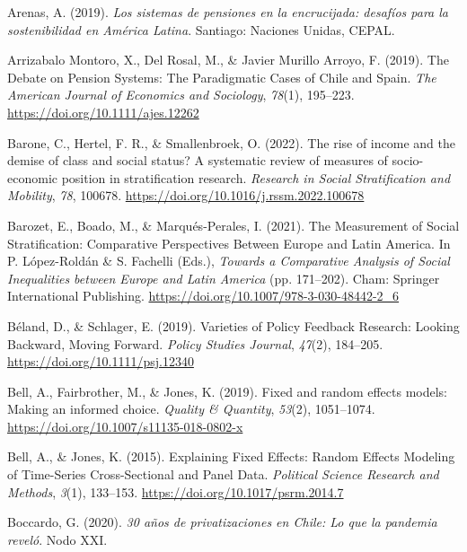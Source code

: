 \documentclass[
  12pt,
]{article}
\newlength{\cslhangindent}
\newenvironment{CSLReferences}[2] %
 {\begin{list}{}{%
  \setlength{\itemindent}{0pt}
  \setlength{\leftmargin}{0pt}
  \setlength{\parsep}{0pt}
  \ifodd #1
   \setlength{\leftmargin}{\cslhangindent}
   \setlength{\itemindent}{-1\cslhangindent}
  \fi
  \setlength{\itemsep}{#2\baselineskip}}}
 {\end{list}}
\begin{document}
\label{refs}
\begin{CSLReferences}{1}{0}
Arenas, A. (2019). \emph{{Los sistemas de pensiones en la encrucijada:
desafíos para la sostenibilidad en América Latina}}. Santiago: Naciones
Unidas, CEPAL.

Arrizabalo Montoro, X., Del Rosal, M., \& Javier Murillo Arroyo, F.
(2019). The {Debate} on {Pension Systems}: {The Paradigmatic Cases} of
{Chile} and {Spain}. \emph{The American Journal of Economics and
Sociology}, \emph{78}(1), 195--223.
\url{https://doi.org/10.1111/ajes.12262}

Barone, C., Hertel, F. R., \& Smallenbroek, O. (2022). The rise of
income and the demise of class and social status? {A} systematic review
of measures of socio-economic position in stratification research.
\emph{Research in Social Stratification and Mobility}, \emph{78},
100678. \url{https://doi.org/10.1016/j.rssm.2022.100678}

Barozet, E., Boado, M., \& Marqués-Perales, I. (2021). The {Measurement}
of {Social Stratification}: {Comparative Perspectives Between Europe}
and {Latin America}. In P. López-Roldán \& S. Fachelli (Eds.),
\emph{Towards a {Comparative Analysis} of {Social Inequalities} between
{Europe} and {Latin America}} (pp. 171--202). Cham: Springer
International Publishing.
\url{https://doi.org/10.1007/978-3-030-48442-2_6}

Béland, D., \& Schlager, E. (2019). Varieties of {Policy Feedback
Research}: {Looking Backward}, {Moving Forward}. \emph{Policy Studies
Journal}, \emph{47}(2), 184--205.
\url{https://doi.org/10.1111/psj.12340}

Bell, A., Fairbrother, M., \& Jones, K. (2019). Fixed and random effects
models: Making an informed choice. \emph{Quality \& Quantity},
\emph{53}(2), 1051--1074.
\url{https://doi.org/10.1007/s11135-018-0802-x}

Bell, A., \& Jones, K. (2015). Explaining {Fixed Effects}: {Random
Effects Modeling} of {Time-Series Cross-Sectional} and {Panel Data}.
\emph{Political Science Research and Methods}, \emph{3}(1), 133--153.
\url{https://doi.org/10.1017/psrm.2014.7}

Boccardo, G. (2020). \emph{30 años de privatizaciones en {Chile}: {Lo}
que la pandemia reveló}. Nodo XXI.


\end{CSLReferences}
\end{document}
